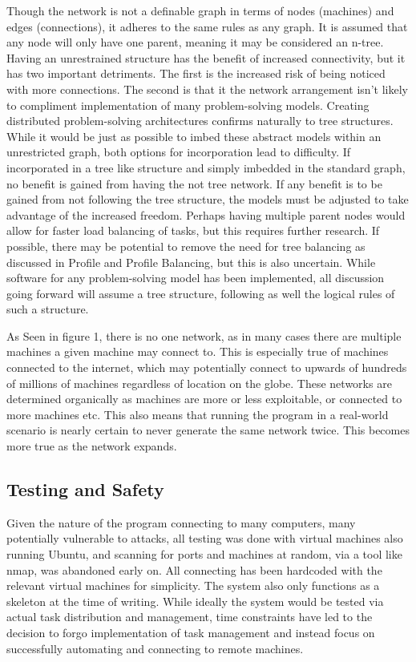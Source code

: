 Though the network is not a definable graph in terms of nodes (machines) and edges (connections), it adheres to the same rules as any graph. It is assumed that any node will only have one parent, meaning it may be considered an n-tree. Having an unrestrained structure has the benefit of increased connectivity, but it has two important detriments. The first is the increased risk of being noticed with more connections. The second is that it the network arrangement isn’t likely to compliment implementation of many problem-solving models. Creating distributed problem-solving architectures confirms naturally to tree structures. While it would be just as possible to imbed these abstract models within an unrestricted graph, both options for incorporation lead to difficulty. If incorporated in a tree like structure and simply imbedded in the standard graph, no benefit is gained from having the not tree network. If any benefit is to be gained from not following the tree structure, the models must be adjusted to take advantage of the increased freedom. Perhaps having multiple parent nodes would allow for faster load balancing of tasks, but this requires further research. If possible, there may be potential to remove the need for tree balancing as discussed in Profile and Profile Balancing, but this is also uncertain. While software for any problem-solving model has been implemented, all discussion going forward will assume a tree structure, following as well the logical rules of such a structure.

As Seen in figure 1, there is no one network, as in many cases there are multiple machines a given machine may connect to. This is especially true of machines connected to the internet, which may potentially connect to upwards of hundreds of millions of machines regardless of location on the globe. These networks are determined organically as machines are more or less exploitable, or connected to more machines etc. This also means that running the program in a real-world scenario is nearly certain to never generate the same network twice. This becomes more true as the network expands.
\subsection{Testing and Safety}
Given the nature of the program connecting to many computers, many potentially vulnerable to attacks, all testing was done with virtual machines also running Ubuntu, and scanning for ports and machines at random, via a tool like nmap, was abandoned early on. All connecting has been hardcoded with the relevant virtual machines for simplicity. The system also only functions as a skeleton at the time of writing. While ideally the system would be tested via actual task distribution and management, time constraints have led to the decision to forgo implementation of task management and instead focus on successfully automating and connecting to remote machines.

